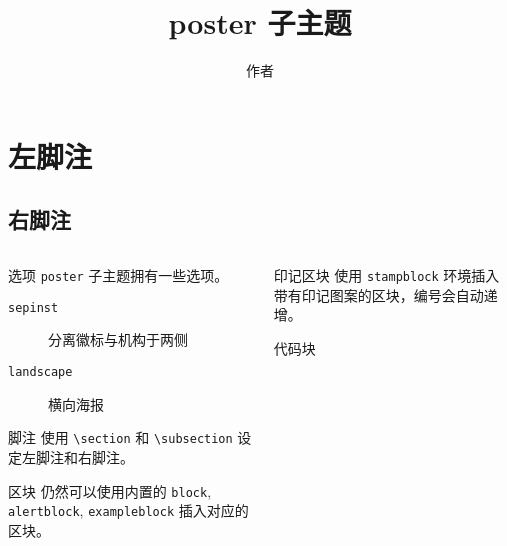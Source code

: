 \documentclass{ctexbeamer}
\begin{document}
  \title{poster 子主题}
  \author{作者}
  \section{左脚注}
  \subsection{右脚注}
  \begin{frame}[fragile]
    \begin{columns}
      \begin{column}{0.45\textwidth}
        \begin{block}{选项}
          \texttt{poster} 子主题拥有一些选项。
          \begin{description}
            \item[\texttt{sepinst}] 分离徽标与机构于两侧
            \item[\texttt{landscape}] 横向海报 
          \end{description}
        \end{block}
        \begin{alertblock}{脚注}
          使用 \texttt{\textbackslash{}section} 和 \texttt{\textbackslash{}subsection} 设定左脚注和右脚注。
        \end{alertblock}
        \begin{exampleblock}{区块}
          仍然可以使用内置的 \texttt{block}, \texttt{alertblock}, \texttt{exampleblock} 插入对应的区块。
        \end{exampleblock}
      \end{column}
      \begin{column}{0.45\textwidth}
        
        \begin{stampblock}{印记区块}
          使用 \texttt{stampblock} 环境插入带有印记图案的区块，编号会自动递增。
        \end{stampblock}
        
        
        \begin{codeblock}[escapechar=|]{代码块}
        \end{codeblock}
        

      \end{column}
    \end{columns}
  \end{frame}
\end{document}
